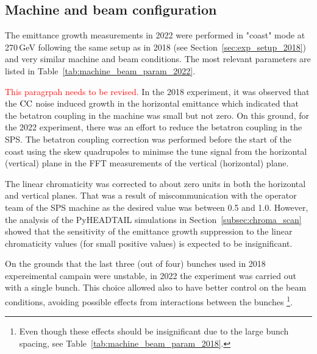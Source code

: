 \subsection{Machine and beam configuration}\label{sec:cc_md_2022_parameters}
The emittance growth measurements in 2022 were performed in "coast" mode at 270\,GeV following the same setup as in 2018 (see Section~\ref{sec:exp_setup_2018}) and very similar machine and beam conditions. The most relevant parameters are listed in Table~\ref{tab:machine_beam_param_2022}. 

\textcolor{red}{This paragrpah needs to be revised.}
In the 2018 experiment, it was observed that the ${\mathrm{CC}}$ noise induced growth in the horizontal emittance which indicated that the betatron coupling in the machine was small but not zero. On this ground, for the 2022 experiment, there was an effort to reduce the betatron coupling in the SPS. The betatron coupling correction was performed before the start of the coast using the skew quadrupoles to minimse the tune signal from the horizontal (vertical) plane in the FFT measurements of the vertical (horizontal) plane.

The linear chromaticity was corrected to about zero units in both the horizontal and vertical planes. That was a result of miscommunication with the operator team of the SPS machine as the desired value was between 0.5 and 1.0. However, the analysis of the PyHEADTAIL simulations in Section~\ref{subsec:chroma_scan} showed that the sensitivity of the emittance growth suppression to the linear chromaticity values (for small positive values) is expected to be insignificant. 

On the grounds that the last three (out of four) bunches used in 2018 expereimental campain were unstable, in 2022 the experiment was carried out with a single bunch. This choice allowed also to have better control on the beam conditions, avoiding possible effects from interactions between the bunches \footnote{Even though these effects should be insignificant due to the large bunch spacing, see Table~\ref{tab:machine_beam_param_2018}.}.

